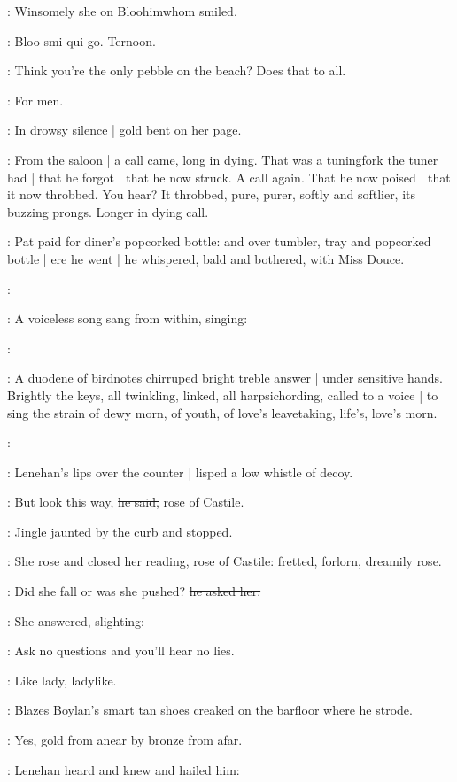 :
Winsomely she on Bloohimwhom smiled.

:
Bloo smi qui go.
Ternoon.

\BloomInt:
Think you're the only pebble on the beach?
Does that to all.

\BloomInt:
For men.

:
In drowsy silence |
gold bent on her page.

:
From the saloon |
a call came,
long in dying.
That was a tuningfork the tuner had |
that he forgot |
that he now struck.
A call again.
That he now poised |
that it now throbbed.
You hear?
It throbbed,
pure,
purer,
softly and softlier,
its buzzing prongs.
Longer in dying call.

:
Pat paid for diner's popcorked bottle:
and over tumbler, tray and popcorked bottle |
ere he went |
he whispered,
bald and bothered,
with Miss Douce.

\simon:

:
A voiceless song sang from within,
singing:

\simon:

:
A duodene of birdnotes chirruped bright treble answer |
under sensitive hands.
Brightly the keys,
all twinkling,
linked,
all harpsichording,
called to a voice |
to sing the strain of dewy morn,
of youth,
of love's leavetaking,
life's,
love's morn.

\simon:

:
Lenehan's lips over the counter |
lisped a low whistle of decoy.

\lenehan:
But look this way,
\sout{he said,}
rose of Castile.

:
Jingle jaunted by the curb
and stopped.

:
She rose and closed her reading,
rose of Castile:
fretted,
forlorn,
dreamily rose.

\lenehan:
Did she fall or was she pushed?
\sout{he asked her.}

:
She answered,
slighting:

\MissK:
Ask no questions and you'll hear no lies.

:
Like lady,
ladylike.

:
Blazes Boylan's smart tan shoes creaked on the barfloor
where he strode.

:
Yes,
gold from anear
by bronze from afar.

:
Lenehan heard and knew and hailed him:

